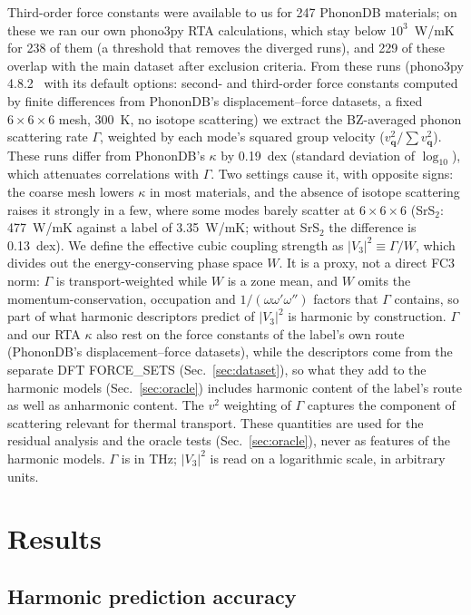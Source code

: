 \documentclass[aps,prm,reprint,onecolumn,groupedaddress]{revtex4-2}
\begin{document}
Third-order force constants were available to us for 247 PhononDB materials; on these we ran our own phono3py RTA calculations, which stay below $10^3$~W/mK for 238 of them (a threshold that removes the diverged runs), and 229 of these overlap with the main dataset after exclusion criteria. From these runs (phono3py 4.8.2~\cite{togo2015} with its default options: second- and third-order force constants computed by finite differences from PhononDB's displacement--force datasets, a fixed $6\times6\times6$ mesh, 300~K, no isotope scattering) we extract the BZ-averaged phonon scattering rate $\Gamma$, weighted by each mode's squared group velocity ($v_\mathbf{q}^2 / \sum v_\mathbf{q}^2$). These runs differ from PhononDB's $\kappa$ by 0.19~dex (standard deviation of $\log_{10}$), which attenuates correlations with $\Gamma$. Two settings cause it, with opposite signs: the coarse mesh lowers $\kappa$ in most materials, and the absence of isotope scattering raises it strongly in a few, where some modes barely scatter at $6\times6\times6$ (SrS$_2$: 477~W/mK against a label of 3.35~W/mK; without SrS$_2$ the difference is 0.13~dex). We define the effective cubic coupling strength as $|V_3|^2 \equiv \Gamma/W$, which divides out the energy-conserving phase space $W$. It is a proxy, not a direct FC3 norm: $\Gamma$ is transport-weighted while $W$ is a zone mean, and $W$ omits the momentum-conservation, occupation and $1/(\omega\omega'\omega'')$ factors that $\Gamma$ contains, so part of what harmonic descriptors predict of $|V_3|^2$ is harmonic by construction. $\Gamma$ and our RTA $\kappa$ also rest on the force constants of the label's own route (PhononDB's displacement--force datasets), while the descriptors come from the separate DFT FORCE\_SETS (Sec.~\ref{sec:dataset}), so what they add to the harmonic models (Sec.~\ref{sec:oracle}) includes harmonic content of the label's route as well as anharmonic content. The $v^2$ weighting of $\Gamma$ captures the component of scattering relevant for thermal transport. These quantities are used for the residual analysis and the oracle tests (Sec.~\ref{sec:oracle}), never as features of the harmonic models. $\Gamma$ is in THz; $|V_3|^2$ is read on a logarithmic scale, in arbitrary units.

\section{Results}

\subsection{Harmonic prediction accuracy}
\label{sec:accuracy}
\end{document}

